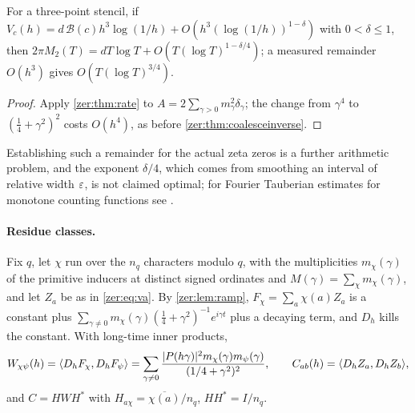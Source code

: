 \begin{corollary}\label{zer:cor:ratezeta}
For a three-point stencil, if $V_c(h)=d\,\mathcal B(c)h^3\log(1/h)+O(h^3(\log(1/h))^{1-\delta})$ with
$0<\delta\le1$, then $2\pi M_2(T)=dT\log T+O(T(\log T)^{1-\delta/4})$; a measured remainder $O(h^3)$ gives
$O(T(\log T)^{3/4})$.
\end{corollary}
\begin{proof}
Apply \cref{zer:thm:rate} to $A=2\sum_{\gamma>0}m_\gamma^2\delta_\gamma$; the change from $\gamma^4$ to
$(\tfrac14+\gamma^2)^2$ costs $O(h^4)$, as before \cref{zer:thm:coalesceinverse}.
\end{proof}

Establishing such a remainder for the actual zeta zeros is a further arithmetic problem, and the exponent
$\delta/4$, which comes from smoothing an interval of relative width $\varepsilon$, is not claimed optimal; for Fourier
Tauberian estimates for monotone counting functions see \cite{Safarov2001Fourier}.

\paragraph{Residue classes.}
Fix $q$, let $\chi$ run over the $n_q$ characters modulo $q$, with the multiplicities $m_\chi(\gamma)$ of the
primitive inducers at distinct signed ordinates and $M(\gamma)=\sum_\chi m_\chi(\gamma)$, and let $Z_a$ be as in
\eqref{zer:eq:va}. By \cref{zer:lem:ramp}, $F_\chi=\sum_a\chi(a)Z_a$ is a constant plus
$\sum_{\gamma\ne0}m_\chi(\gamma)(\tfrac14+\gamma^2)^{-1}e^{i\gamma t}$ plus a decaying term, and $D_h$ kills the constant.
With long-time inner products,
\[
 W_{\chi\psi}(h)=\langle D_hF_\chi,D_hF_\psi\rangle=\sum_{\gamma\ne0}\frac{\lvert P(h\gamma)\rvert^2m_\chi(\gamma)m_\psi(\gamma)}{(1/4+\gamma^2)^2},
 \qquad C_{ab}(h)=\langle D_hZ_a,D_hZ_b\rangle ,
\]
and $C=HWH^*$ with $H_{a\chi}=\overline{\chi(a)}/n_q$, $HH^*=I/n_q$.

